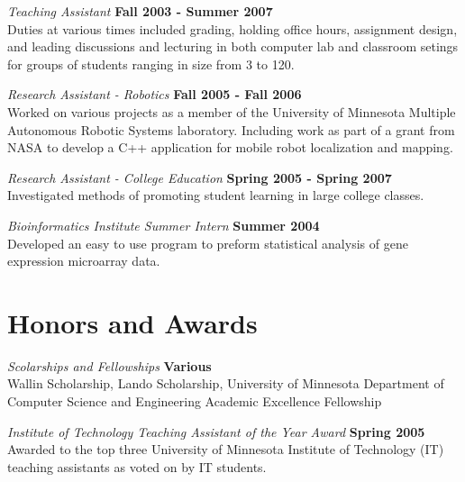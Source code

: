 \documentclass[margin,line]{res}
\begin{document}
\begin{resume}
{\em Teaching Assistant} \hfill {\bf Fall 2003  - Summer 2007}\\
Duties at various times included grading, holding office hours,
assignment design, and leading discussions and lecturing in both
computer lab and classroom setings for groups of students ranging in
size from 3 to 120.

\vspace{-.1cm}
{\em Research Assistant - Robotics} \hfill {\bf Fall 2005 - Fall 2006}\\
Worked on various projects as a member of the University of Minnesota
Multiple Autonomous Robotic Systems laboratory. Including work as part
of a grant from NASA to develop a C++ application for mobile
robot localization and mapping.

\vspace{-.1cm}
{\em Research Assistant - College Education} \hfill {\bf Spring 2005 - Spring 2007}\\
Investigated methods of promoting student learning in large college classes. 

\vspace{-.1cm}
{\em Bioinformatics Institute Summer Intern} \hfill {\bf Summer 2004}\\
Developed an easy to use program to preform statistical analysis of gene expression microarray data.

\section{\sc Honors and Awards} 
{\em Scolarships and Fellowships } \hfill {\bf Various}\\
Wallin Scholarship, Lando Scholarship, University of Minnesota Department of Computer Science and Engineering Academic Excellence Fellowship

\vspace{-.1cm}
{\em Institute of Technology Teaching Assistant of the Year Award} \hfill {\bf Spring 2005}\\   
Awarded to the top three University of Minnesota Institute of Technology (IT) teaching assistants as voted on by IT students.


\end{resume}
\end{document}
